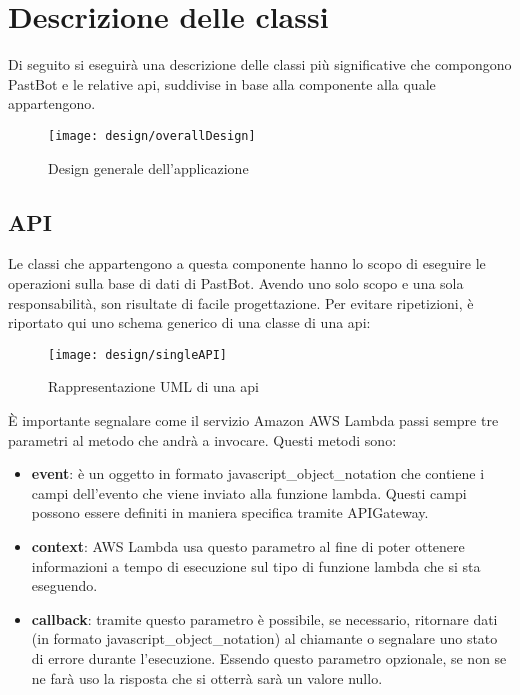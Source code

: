 \section{Descrizione delle classi}
Di seguito si eseguirà una descrizione delle classi più significative che
compongono PastBot e le relative \gls{api}, suddivise in base alla componente
alla quale appartengono.

\begin{figure}[H]
  \centering
  \texttt{[image: design/overallDesign]}
  \caption{Design generale dell'applicazione}
\end{figure}

\subsection{API}

Le classi che appartengono a questa componente hanno lo scopo di eseguire le
operazioni sulla base di dati di PastBot. Avendo uno solo scopo e una sola
responsabilità, son risultate di facile progettazione.
Per evitare ripetizioni, è riportato qui uno schema generico di una classe
di una \gls{api}:

\begin{figure}[H]
  \centering
  \texttt{[image: design/singleAPI]}
  \caption{Rappresentazione UML di una \gls{api}}
\end{figure}

\label{design:api:params}
È importante segnalare come il servizio Amazon AWS Lambda passi sempre tre
parametri al metodo che andrà a invocare. Questi metodi sono:
\begin{itemize}
  \item \textbf{event}: è un oggetto in formato
\gls{javascript_object_notation} che contiene i campi
dell'evento che viene inviato alla funzione lambda. Questi campi possono essere
definiti in maniera specifica tramite APIGateway.
  \item \textbf{context}: AWS Lambda usa questo parametro al fine di poter
ottenere informazioni a tempo di esecuzione sul tipo di funzione lambda che si
sta eseguendo.
  \item \textbf{callback}: tramite questo parametro è possibile, se necessario,
ritornare dati (in formato \gls{javascript_object_notation}) al chiamante o
segnalare uno stato di errore durante l'esecuzione. Essendo questo parametro
opzionale, se non se ne farà uso la risposta che si otterrà sarà un valore
nullo.
\end{itemize}

